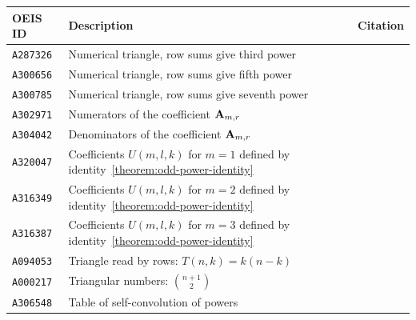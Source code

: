 \begin{center}
    \renewcommand{\arraystretch}{1.3}
    \begin{tabular}{lll}
        \toprule
        \textbf{OEIS ID} & \textbf{Description}                                                                         & \textbf{Citation}                                                  \\
        \midrule
        \texttt{A287326} & Numerical triangle, row sums give third power                                                & ~\cite{oeis_numerical_triangle_row_sums_give_cubes}                \\
        \texttt{A300656} & Numerical triangle, row sums give fifth power                                                & ~\cite{oeis_numerical_triangle_row_sums_give_fifth_powers}         \\
        \texttt{A300785} & Numerical triangle, row sums give seventh power                                              & ~\cite{oeis_numerical_triangle_row_sums_give_seventh_powers}       \\
        \texttt{A302971} & Numerators of the coefficient ${\mathbf{A}} \sb{m,r}$                                                & ~\cite{oeis_numerators_of_the_coefficient_a_m_r}                   \\
        \texttt{A304042} & Denominators of the coefficient ${\mathbf{A}} \sb{m,r}$                                              & ~\cite{oeis_denominators_of_the_coefficient_a_m_r}                 \\
        \texttt{A320047} & Coefficients $U(m, l, k)$ for $m = 1$ defined by identity~\eqref{theorem:odd-power-identity} & ~\cite{oeis_coefficients_u_m_l_k_defined_by_polynomial_identity_1} \\
        \texttt{A316349} & Coefficients $U(m, l, k)$ for $m = 2$ defined by identity~\eqref{theorem:odd-power-identity} & ~\cite{oeis_coefficients_u_m_l_k_defined_by_polynomial_identity_2} \\
        \texttt{A316387} & Coefficients $U(m, l, k)$ for $m = 3$ defined by identity~\eqref{theorem:odd-power-identity} & ~\cite{oeis_coefficients_u_m_l_k_defined_by_polynomial_identity_3} \\
        \texttt{A094053} & Triangle read by rows: $T(n, k) = k(n-k) $                                                   & ~\cite{zumkeller2004entry}                                         \\
        \texttt{A000217} & Triangular numbers: $\binom{n+1}{2}$                                                         & ~\cite{sloane2015triangular}                                       \\
        \texttt{A306548} & Table of self-convolution of powers                                                          & ~\cite{kolosov2019entry}                                           \\
        \bottomrule
    \end{tabular}
\end{center}
